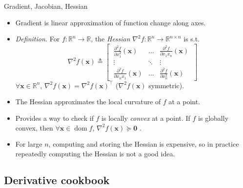 \documentclass{beamer}
\numberwithin{equation}{section}
\begin{document}
\begin{frame}{Gradient, Jacobian, Hessian}
    \begin{itemize}
        \item
        Gradient is linear approximation of function change along axes.

        \item
        \textit{Definition.} For $ f : \mathbb{R}^n \rightarrow \mathbb{R} $,
        the \textit{Hessian} $ \nabla^2f : \mathbb{R}^n \rightarrow
        \mathbb{R}^{n \times n} $ is s.t.
        \begin{equation*}
            \nabla^2 f(\mathbf{x}) \triangleq \begin{bmatrix}
                \ \frac{\partial^2 f}{\partial x_1^2}(\mathbf{x}) & \ldots &
                    \frac{\partial^2 f}{\partial x_1x_n}(\mathbf{x}) \ \\
                \ \vdots & \ddots & \vdots \ \\
                \ \frac{\partial^2 f}{\partial x_nx_1}(\mathbf{x}) & \ldots &
                    \frac{\partial^2 f}{\partial x_n^2}(\mathbf{x}) \
            \end{bmatrix}
        \end{equation*}
        $ \forall \mathbf{x} \in \mathbb{R}^n $, $ \nabla^2f(\mathbf{x})
        = \nabla^2f(\mathbf{x})^\top $ ($ \nabla^2f(\mathbf{x}) $ symmetric).

        \item
        The Hessian approximates the local curvature of $ f $ at a point.

        \item
        Provides a way to check if $ f $ is locally \textit{convex} at a
        point. If $ f $ is globally convex, then $ \forall \mathbf{x} \in
        \operatorname{dom}f $, $ \nabla^2f(\mathbf{x}) \succeq \mathbf{0} $
        \cite{bv_convex_opt}.

        \item
        For large $ n $, computing and storing the Hessian is expensive, so
        in practice repeatedly computing the Hessian is not a good idea.
    \end{itemize}
\end{frame}

\subsection{Derivative cookbook}
\end{document}
